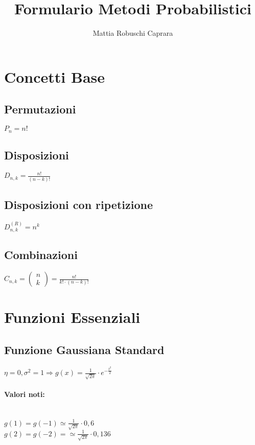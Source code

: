 \documentclass{article}
\title{Formulario Metodi Probabilistici}
\author{Mattia Robuschi Caprara}
\date{}
\begin{document}
\maketitle

\newpage

\tableofcontents

\newpage


\section{Concetti Base}
\subsection{Permutazioni}
$P_n = n! $

\subsection{Disposizioni}
$D_{n,k} = \frac{n!}{(n-k)!}$

\subsection{Disposizioni con ripetizione}
$D_{n,k}^{(R)} = n^k$

\subsection{Combinazioni}
$C_{n,k} = \left( \begin{matrix} 
n \\ 
k 
\end{matrix} \right) = \frac{n!}{k! \cdot (n-k)!}$

\section{Funzioni Essenziali}

\subsection{Funzione Gaussiana Standard}
$\eta = 0, \sigma^2 = 1 \Rightarrow g(x) = \frac{1}{\sqrt{2 \pi }} \cdot e^{- \frac{t^2}{2}}$

\paragraph{Valori noti:} ~\\
$g(1) = g(-1) \simeq  \frac{1}{\sqrt{2 \pi }} \cdot 0,6 $ \\
$g(2) = g(-2) = \simeq  \frac{1}{\sqrt{2 \pi }} \cdot 0,136$
\end{document}
